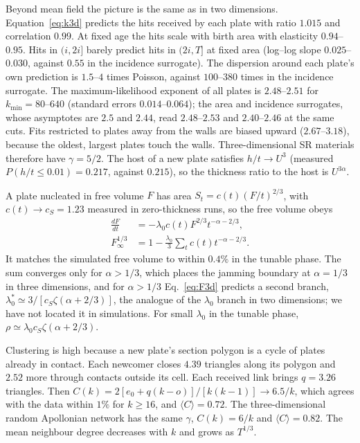 \documentclass[pre,twocolumn,superscriptaddress,amsmath,amssymb,floatfix]{revtex4-2}
\begin{document}
Beyond mean field the picture is the same as in two dimensions. Equation~\eqref{eq:k3d}
predicts the hits received by each plate with ratio $1.015$ and correlation $0.99$. At
fixed age the hits scale with birth area with elasticity $0.94$--$0.95$. Hits in
$(i,2i]$ barely predict hits in $(2i,T]$ at fixed area (log--log slope
$0.025$--$0.030$, against $0.55$ in the incidence surrogate). The dispersion around
each plate's own prediction is $1.5$--$4$ times Poisson, against $100$--$380$ times in
the incidence surrogate. The maximum-likelihood exponent of all plates is
$2.48$--$2.51$ for $k_{\min}=80$--$640$ (standard errors $0.014$--$0.064$); the area and incidence surrogates, whose asymptotes are
$2.5$ and $2.44$, read $2.48$--$2.53$ and $2.40$--$2.46$ at the same cuts. Fits restricted
to plates away from the walls are biased upward ($2.67$--$3.18$), because the oldest,
largest plates touch the walls. Three-dimensional SR materials therefore have
$\gamma=5/2$. The host of a
new plate satisfies $h/t\to U^3$ (measured $P(h/t\le0.01)=0.217$, against $0.215$), so the
thickness ratio to the host is $U^{3\alpha}$.

A plate nucleated in free volume $F$ has area $S_t=c(t)(F/t)^{2/3}$, with
$c(t)\to c_S=1.23$ measured in zero-thickness runs, so the free volume obeys
\begin{equation}
  \begin{aligned}
  \frac{dF}{dt}&=-\lambda_0c(t)F^{2/3}t^{-\alpha-2/3},\\
  F_\infty^{1/3}&=1-\frac{\lambda_0}{3}\sum_tc(t)t^{-\alpha-2/3}.
  \end{aligned}
  \label{eq:F3d}
\end{equation}
It matches the simulated free volume to within $0.4\%$ in the tunable phase. The sum
converges only for $\alpha>1/3$, which places the jamming boundary at $\alpha=1/3$ in three
dimensions, and for $\alpha>1/3$ Eq.~\eqref{eq:F3d} predicts a second branch,
$\lambda_0^*\simeq3/[c_S\zeta(\alpha+2/3)]$, the analogue of the $\lambda_0$ branch in two
dimensions; we have not located it in simulations. For small $\lambda_0$ in the tunable
phase, $\rho\simeq\lambda_0c_S\zeta(\alpha+2/3)$.

Clustering is high because a new plate's section polygon is a cycle of plates already in
contact. Each newcomer closes $4.39$ triangles along its polygon and $2.52$ more through
contacts outside its cell. Each received link brings $q=3.26$ triangles. Then
$C(k)=2[e_0+q(k-o)]/[k(k-1)]\to6.5/k$, which agrees with the data within $1\%$ for $k\ge16$,
and $\langle C\rangle=0.72$. The three-dimensional random Apollonian network has the same
$\gamma$, $C(k)=6/k$ and $\langle C\rangle=0.82$. The mean neighbour degree decreases with
$k$ and grows as $T^{1/3}$.
\end{document}
